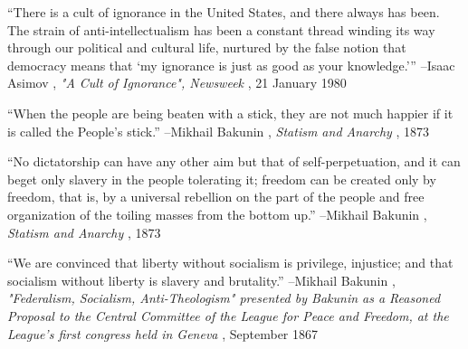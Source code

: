 \documentclass{article}%
\begin{document}
\linebreak%
\vspace{1mm}%
\begin{minipage}{\textwidth}%
\flushleft%
“There is a cult of ignorance in the United States, and there always has been. The strain of anti{-}intellectualism has been a constant thread winding its way through our political and cultural life, nurtured by the false notion that democracy means that ‘my ignorance is just as good as your knowledge.’”%
\linebreak%
\vspace{1mm}%
–Isaac Asimov%
, \textit{"A Cult of Ignorance", Newsweek}%
, 21 January 1980%
\linebreak%
\vspace{1mm}%
\end{minipage}%
\linebreak%
\vspace{1mm}%
\begin{minipage}{\textwidth}%
\flushleft%
“When the people are being beaten with a stick, they are not much happier if it is called the People's stick.”%
\linebreak%
\vspace{1mm}%
–Mikhail Bakunin%
, \textit{Statism and Anarchy}%
, 1873%
\linebreak%
\vspace{1mm}%
\end{minipage}%
\linebreak%
\vspace{1mm}%
\begin{minipage}{\textwidth}%
\flushleft%
“No dictatorship can have any other aim but that of self{-}perpetuation, and it can beget only slavery in the people tolerating it; freedom can be created only by freedom, that is, by a universal rebellion on the part of the people and free organization of the toiling masses from the bottom up.”%
\linebreak%
\vspace{1mm}%
–Mikhail Bakunin%
, \textit{Statism and Anarchy}%
, 1873%
\linebreak%
\vspace{1mm}%
\end{minipage}%
\linebreak%
\vspace{1mm}%
\begin{minipage}{\textwidth}%
\flushleft%
“We are convinced that liberty without socialism is privilege, injustice; and that socialism without liberty is slavery and brutality.”%
\linebreak%
\vspace{1mm}%
–Mikhail Bakunin%
, \textit{"Federalism, Socialism, Anti-Theologism" presented by Bakunin as a Reasoned Proposal  to the Central Committee of the League for Peace and Freedom, at the League's first  congress held in Geneva}%
, September 1867%
\linebreak%
\vspace{1mm}%
\end{minipage}%
\end{document}
